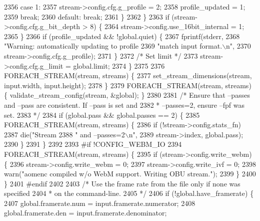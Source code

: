 \begin{DoxyCodeInclude}
{{{{{{{{{{{{{{{{{{{{{{{{{{{{{{{{{{{{{{{{{{{{{{{{{{{{{2356           \textcolor{keywordflow}{case} 1:
2357             stream->config.cfg.g\_profile = 2;
2358             profile\_updated = 1;
2359             \textcolor{keywordflow}{break};
2360           \textcolor{keywordflow}{default}: \textcolor{keywordflow}{break};
2361         \}
2362       \}
2363       \textcolor{keywordflow}{if} (stream->config.cfg.g\_bit\_depth > 8) \{
2364         stream->config.use\_16bit\_internal = 1;
2365       \}
2366       \textcolor{keywordflow}{if} (profile\_updated && !global.quiet) \{
2367         fprintf(stderr,
2368                 \textcolor{stringliteral}{"Warning: automatically updating to profile %
2369                 \textcolor{stringliteral}{"match input format.\(\backslash\)n"},
2370                 stream->config.cfg.g\_profile);
2371       \}
2372       \textcolor{comment}{/* Set limit */}
2373       stream->config.cfg.g\_limit = global.limit;
2374     \}
2375 
2376     FOREACH\_STREAM(stream, streams) \{
2377       set\_stream\_dimensions(stream, input.width, input.height);
2378     \}
2379     FOREACH\_STREAM(stream, streams) \{ validate\_stream\_config(stream, &global); \}
2380 
2381     \textcolor{comment}{/* Ensure that --passes and --pass are consistent. If --pass is set and}
2382 \textcolor{comment}{     * --passes=2, ensure --fpf was set.}
2383 \textcolor{comment}{     */}
2384     \textcolor{keywordflow}{if} (global.pass && global.passes == 2) \{
2385       FOREACH\_STREAM(stream, streams) \{
2386         \textcolor{keywordflow}{if} (!stream->config.stats\_fn)
2387           die(\textcolor{stringliteral}{"Stream %
2388               \textcolor{stringliteral}{" and --passes=2\(\backslash\)n"},
2389               stream->index, global.pass);
2390       \}
2391     \}
2392 
2393 \textcolor{preprocessor}{#if !CONFIG\_WEBM\_IO}
2394     FOREACH\_STREAM(stream, streams) \{
2395       \textcolor{keywordflow}{if} (stream->config.write\_webm) \{
2396         stream->config.write\_webm = 0;
2397         stream->config.write\_ivf = 0;
2398         warn(\textcolor{stringliteral}{"aomenc compiled w/o WebM support. Writing OBU stream."});
2399       \}
2400     \}
2401 \textcolor{preprocessor}{#endif}
2402 
2403     \textcolor{comment}{/* Use the frame rate from the file only if none was specified}
2404 \textcolor{comment}{     * on the command-line.}
2405 \textcolor{comment}{     */}
2406     \textcolor{keywordflow}{if} (!global.have\_framerate) \{
2407       global.framerate.num = input.framerate.numerator;
2408       global.framerate.den = input.framerate.denominator;
}}}}}}}}}}}}}}}}}}}}}}}}}}}}}}}}}}}}}}}}}}}}}}}}}}}}}}}
\end{DoxyCodeInclude}

